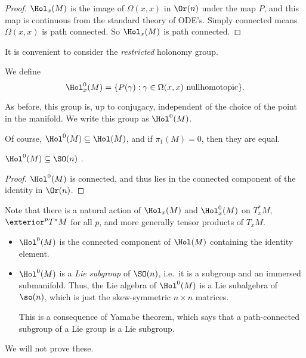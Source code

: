 \documentclass[a4paper]{article}
\begin{document}
\begin{proof}
  $\Hol_x(M)$ is the image of $\Omega(x, x)$ in $\Or(n)$ under the map $P$, and this map is continuous from the standard theory of ODE's. Simply connected means $\Omega(x, x)$ is path connected. So $\Hol_x(M)$ is path connected.
\end{proof}

It is convenient to consider the \emph{restricted} holonomy group.

\begin{defi}
  We define
  \[
    \Hol_x^0(M) = \{P(\gamma): \gamma \in \Omega(x, x) \text{ nullhomotopic}\}.
  \]
\end{defi}
As before, this group is, up to conjugacy, independent of the choice of the point in the manifold. We write this group as $\Hol^0(M)$.

Of course, $\Hol^0(M) \subseteq \Hol(M)$, and if $\pi_1(M) = 0$, then they are equal.

\begin{cor}
  $\Hol^0(M) \subseteq \SO(n)$ .
\end{cor}

\begin{proof}
  $\Hol^0(M)$ is connected, and thus lies in the connected component of the identity in $\Or(n)$.
\end{proof}

Note that there is a natural action of $\Hol_x(M)$ and $\Hol^0_x(M)$ on $T^*_x M$, $\exterior^p T^*M$ for all $p$, and more generally tensor products of $T_xM$.

\begin{fact}\leavevmode
  \begin{itemize}
    \item $\Hol^0(M)$ is the connected component of $\Hol(M)$ containing the identity element.
    \item $\Hol^0(M)$ is a \emph{Lie subgroup} of $\SO(n)$, i.e.\ it is a subgroup and an immersed submanifold. Thus, the Lie algebra of $\Hol^0(M)$ is a Lie subalgebra of $\so(n)$, which is just the skew-symmetric $n \times n$ matrices.

      This is a consequence of Yamabe theorem, which says that a path-connected subgroup of a Lie group is a Lie subgroup.
  \end{itemize}
\end{fact}
We will not prove these.
\end{document}
